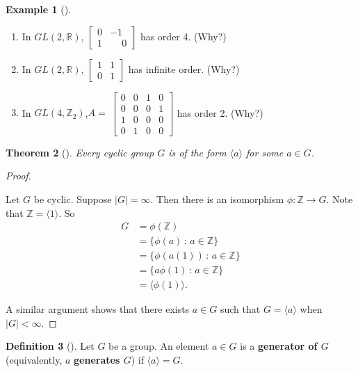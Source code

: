 \documentclass[10pt,openany,oneside]{book}
\newcommand{\terminology}[1]{\textbf{#1}}
\theoremstyle{plain}
\newtheorem{theorem}{Theorem}[section]
\theoremstyle{definition}
\newtheorem{definition}[theorem]{Definition}
\theoremstyle{definition}
\theoremstyle{definition}
\newtheorem{example}[theorem]{Example}
\theoremstyle{definition}
\numberwithin{equation}{section}
\def\Z{\mathbb{Z}}
\def\R{\mathbb{R}}
\newcommand{\lt}{<}
\newcommand{\amp}{&}
\begin{document}
\begin{example}[]
\begin{enumerate}
\item\hypertarget{li-258}{}In \(GL(2,\R)\), \(\begin{bmatrix}
0 \amp  -1 \\
1 \amp  \phantom{-}0
\end{bmatrix} \) has order 4. (Why?)%
\item\hypertarget{li-259}{}In \(GL(2,\R)\), \(\begin{bmatrix}
1 \amp  1 \\
0 \amp  1
\end{bmatrix} \) has infinite order. (Why?)%
\item\hypertarget{li-260}{}In \(GL(4,\Z_2)\),\(A=\
\begin{bmatrix}
0 \amp  0 \amp  1 \amp  0 \\
0 \amp  0 \amp  0 \amp  1 \\
1 \amp  0 \amp  0 \amp  0 \\
0 \amp  1 \amp  0 \amp  0
\end{bmatrix} \) has order 2. (Why?)%
\end{enumerate}
%
\end{example}
\begin{theorem}[{}]\label{theorem-27}
Every cyclic group \(G\) is of the form \(\langle a\rangle\) for some \(a\in G\).%
\end{theorem}
\begin{proof}\hypertarget{proof-23}{}
Let \(G\) be cyclic. Suppose \(|G|=\infty\). Then there is an isomorphism \(\phi: \Z\to G\). Note that \(\Z=\langle 1\rangle\). So%
\begin{align*}
G \amp =\phi(\Z)\\
\amp =\{\phi(a)\,:\,a\in \Z\}\\
\amp =\{\phi(a(1))\,:\,a\in \Z\}\\
\amp =\{a\phi(1)\,:\,a\in \Z\}\\
\amp =\langle \phi(1)\rangle.
\end{align*}
%
\par
A similar argument shows that there exists \(a\in G\) such that \(G=\langle a\rangle\) when \(|G|\lt \infty\).%
\end{proof}
\begin{definition}[{}]\label{definition-40}
Let \(G\) be a group. An element \(a\in G\) is a \terminology{generator of \(G\)} (equivalently, \(a\) \terminology{generates \(G\)}) if \(\langle a\rangle =G\).%
\end{definition}
\end{document}
